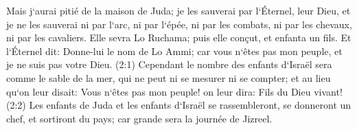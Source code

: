 \verse Mais j`aurai pitié de la maison de Juda; je les sauverai par l`Éternel, leur Dieu, et je ne les sauverai ni par l`arc, ni par l`épée, ni par les combats, ni par les chevaux, ni par les cavaliers. 
\verse Elle sevra Lo Ruchama; puis elle conçut, et enfanta un fils. 
\verse Et l`Éternel dit: Donne-lui le nom de Lo Ammi; car vous n`êtes pas mon peuple, et je ne suis pas votre Dieu. 
\verse (2:1) Cependant le nombre des enfants d`Israël sera comme le sable de la mer, qui ne peut ni se mesurer ni se compter; et au lieu qu`on leur disait: Vous n`êtes pas mon peuple! on leur dira: Fils du Dieu vivant! 
\verse (2:2) Les enfants de Juda et les enfants d`Israël se rassembleront, se donneront un chef, et sortiront du pays; car grande sera la journée de Jizreel. 

\chapter{}

